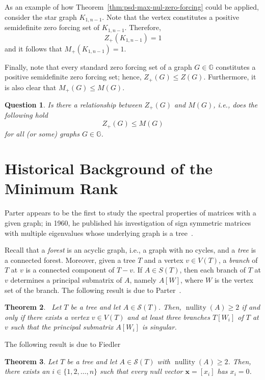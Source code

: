 \documentclass{article}
\newtheorem{theorem}{Theorem}[section]
\newtheorem{question}[theorem]{Question}
\theoremstyle{definition}
\newcommand\nullity[1]{\operatorname{nullity}\left(#1\right)}
\begin{document}
As an example of how Theorem~\ref{thm:psd-max-nul-zero-forcing} could be applied, consider the star graph $K_{1,n-1}$. 
Note that the  vertex constitutes a positive semidefinite zero forcing set of $K_{1,n-1}$.
Therefore, 
\[
Z_{+}(K_{1,n-1}) = 1
\]
and it follows that $M_{+}(K_{1,n-1}) = 1$.

Finally, note that every standard zero forcing set of a graph $G\in\mathbb{G}$ constitutes a positive semidefinite zero forcing set; hence, $Z_{+}(G)\leq Z(G)$.
Furthermore, it is also clear that $M_{+}(G)\leq M(G)$.
\begin{question}
Is there a relationship between $Z_{+}(G)$ and $M(G)$, i.e., does the following hold
\[
Z_{+}(G) \leq M(G)
\]
for all (or some) graphs $G\in\mathbb{G}$.
\end{question}

\section{Historical Background of the Minimum Rank}
Parter appears to be the first to study the spectral properties of matrices with a given graph; in 1960, he published his investigation of sign symmetric matrices with multiple eigenvalues whose underlying graph is a tree~\cite{Parter1960}.

Recall that a \emph{forest} is an acyclic graph, i.e., a graph with no cycles, and a \emph{tree} is a connected forest. 
Moreover, given a tree $T$ and a vertex $v\in V(T)$, a \emph{branch} of $T$ at $v$ is a connected component of $T-v$. 
If $A\in S(T)$, then each branch of $T$ at $v$ determines a principal submatrix of $A$, namely $A[W]$, where $W$ is the vertex set of the branch. 
The following result is due to Parter~\cite{Parter1960}.
\begin{theorem}~\label{thm:parter}
Let $T$ be a tree and let $A\in\mathcal{S}(T)$. 
Then, $\nullity{A}\geq 2$ if and only if there exists a vertex $v\in V(T)$ and at least three branches $T[W_{i}]$ of $T$ at $v$ such that the principal submatrix $A[W_{i}]$ is singular. 
\end{theorem}

The following result is due to Fiedler~\cite{Fiedler1975}
\begin{theorem}\label{thm:fiedler1}
Let $T$ be a tree and let $A\in\mathcal{S}(T)$ with $\nullity{A}\geq 2$.
Then, there exists an $i\in\{1,2,\ldots,n\}$ such that every null vector $\textbf{x}=[x_{i}]$ has $x_{i}=0$.
\end{theorem}
\end{document}
